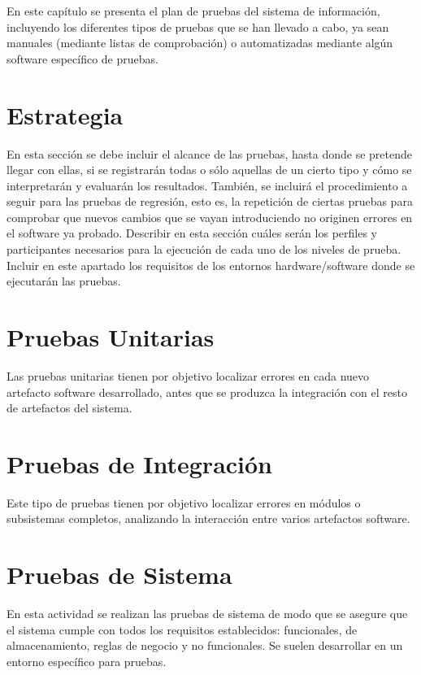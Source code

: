 

En este capítulo se presenta el plan de pruebas del sistema de información, incluyendo los diferentes tipos de pruebas que se han llevado a cabo, ya sean manuales (mediante listas de comprobación) o automatizadas mediante algún software específico de pruebas.

\section{Estrategia}
En esta sección se debe incluir el alcance de las pruebas, hasta donde se pretende llegar con ellas, si se registrarán todas o sólo aquellas de un cierto tipo y cómo se interpretarán y evaluarán los resultados.
También, se incluirá el procedimiento a seguir para las pruebas de regresión, esto es, la repetición de ciertas pruebas para comprobar que nuevos cambios que se vayan introduciendo no originen errores en el software ya probado. Describir en esta sección cuáles serán los perfiles y participantes necesarios para la ejecución de cada uno de los niveles de prueba. Incluir en este apartado los requisitos de los entornos hardware/software donde se ejecutarán las pruebas.

\section{Pruebas Unitarias}
Las pruebas unitarias tienen por objetivo localizar errores en cada nuevo artefacto software desarrollado, antes que se produzca la integración con el resto de artefactos del sistema.

\section{Pruebas de Integración}
Este tipo de pruebas tienen por objetivo localizar errores en módulos o subsistemas completos, analizando la interacción entre varios artefactos software.

\section{Pruebas de Sistema}
En esta actividad se realizan las pruebas de sistema de modo que se asegure que el sistema cumple con todos los requisitos establecidos: funcionales, de almacenamiento, reglas de negocio y no funcionales. Se suelen desarrollar en un entorno específico para pruebas.

